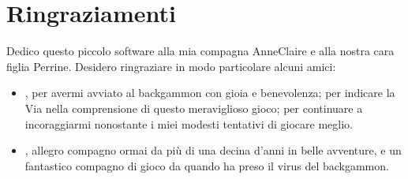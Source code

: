 \documentclass[letterpaper,10pt,italian]{sphinxmanual}
\begin{document}
\chapter{Ringraziamenti}
\label{\detokenize{index:remerciements}}
\sphinxAtStartPar
Dedico questo piccolo software alla mia compagna Anne\sphinxhyphen{}Claire e alla nostra cara figlia Perrine. Desidero ringraziare in modo particolare alcuni amici:
\begin{itemize}
\item {} 
\sphinxAtStartPar
{}, per avermi avviato al backgammon con gioia e benevolenza; per indicare la Via nella comprensione di questo meraviglioso gioco; per continuare a incoraggiarmi nonostante i miei modesti tentativi di giocare meglio.

\item {} 
\sphinxAtStartPar
{}, allegro compagno ormai da più di una decina d’anni in belle avventure, e un fantastico compagno di gioco da quando ha preso il virus del backgammon.

\end{itemize}



\renewcommand{\indexname}{Indice}
\printindex
\end{document}

